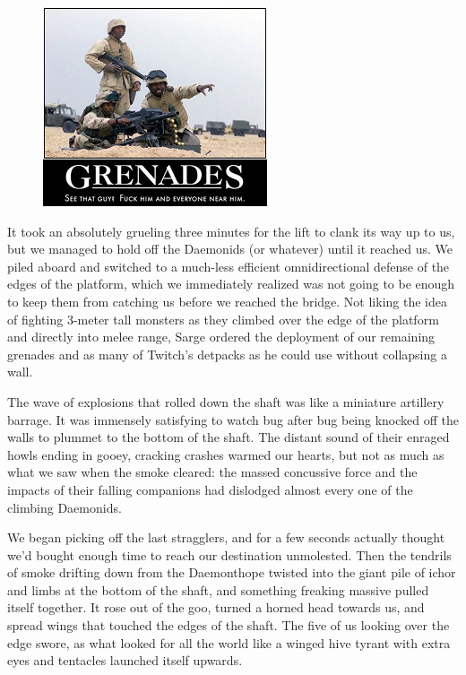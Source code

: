 \begin{figure}
	\begin{center}
		\includegraphics[width=\figwidth]{pics/15/66.png}
	\end{center}
\end{figure}
It took an absolutely grueling three minutes for the lift to clank its way up to us, but we managed to hold off the Daemonids (or whatever) until it reached us. 
We piled aboard and switched to a much-less efficient omnidirectional defense of the edges of the platform, which we immediately realized was not going to be enough to keep them from catching us before we reached the bridge. 
Not liking the idea of fighting 3-meter tall monsters as they climbed over the edge of the platform and directly into melee range, Sarge ordered the deployment of our remaining grenades and as many of Twitch's detpacks as he could use without collapsing a wall.

The wave of explosions that rolled down the shaft was like a miniature artillery barrage. 
It was immensely satisfying to watch bug after bug being knocked off the walls to plummet to the bottom of the shaft. 
The distant sound of their enraged howls ending in gooey, cracking crashes warmed our hearts, but not as much as what we saw when the smoke cleared: 
the massed concussive force and the impacts of their falling companions had dislodged almost every one of the climbing Daemonids. 


We began picking off the last stragglers, and for a few seconds actually thought we'd bought enough time to reach our destination unmolested. 
Then the tendrils of smoke drifting down from the Daemonthope twisted into the giant pile of ichor and limbs at the bottom of the shaft, and something freaking massive pulled itself together. 
It rose out of the goo, turned a horned head towards us, and spread wings that touched the edges of the shaft. 
The five of us looking over the edge swore, as what looked for all the world like a winged hive tyrant with extra eyes and tentacles launched itself upwards.

